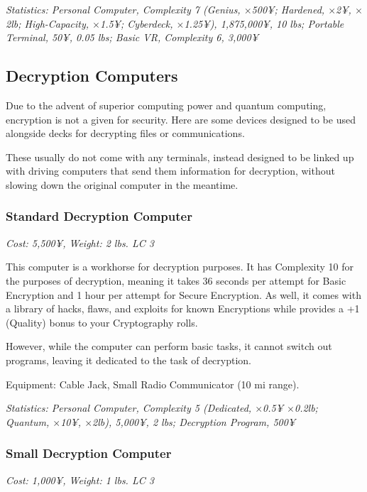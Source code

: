 \begin{multicols*}{3}
	\textit{\textcolor{OliveGreen}{Statistics: Personal Computer, Complexity 7 (Genius, \(\times\)500¥; Hardened, \(\times\)2¥, \(\times\)2lb; High-Capacity, \(\times\)1.5¥; Cyberdeck, \(\times\)1.25¥), 1,875,000¥, 10 lbs; Portable Terminal, 50¥, 0.05 lbs; Basic VR, Complexity 6, 3,000¥}}
	
	\subsection{Decryption Computers}
	
	Due to the advent of superior computing power and quantum computing, encryption is not a given for security. Here are some devices designed to be used alongside decks for decrypting files or communications.
	
	These usually do not come with any terminals, instead designed to be linked up with driving computers that send them information for decryption, without slowing down the original computer in the meantime.
	
	\subsubsection*{Standard Decryption Computer}
	
	\textit{\textcolor{NavyBlue}{Cost: 5,500¥, Weight: 2 lbs. LC 3}}
	
	This computer is a workhorse for decryption purposes. It has Complexity 10 for the purposes of decryption, meaning it takes 36 seconds per attempt for Basic Encryption and 1 hour per attempt for Secure Encryption. As well, it comes with a library of hacks, flaws, and exploits for known Encryptions while provides a +1 (Quality) bonus to your Cryptography rolls.
	
	However, while the computer can perform basic tasks, it cannot switch out programs, leaving it dedicated to the task of decryption.
	
	Equipment: Cable Jack, Small Radio Communicator (10 mi range).
	
	\textit{\textcolor{OliveGreen}{Statistics: Personal Computer, Complexity 5 (Dedicated, \(\times\)0.5¥ \(\times\)0.2lb; Quantum, \(\times\)10¥, \(\times\)2lb), 5,000¥, 2 lbs; Decryption Program, 500¥}}
	
	\subsubsection*{Small Decryption Computer}
	
	\textit{\textcolor{NavyBlue}{Cost: 1,000¥, Weight: 1 lbs. LC 3}}
	

\end{multicols*}
